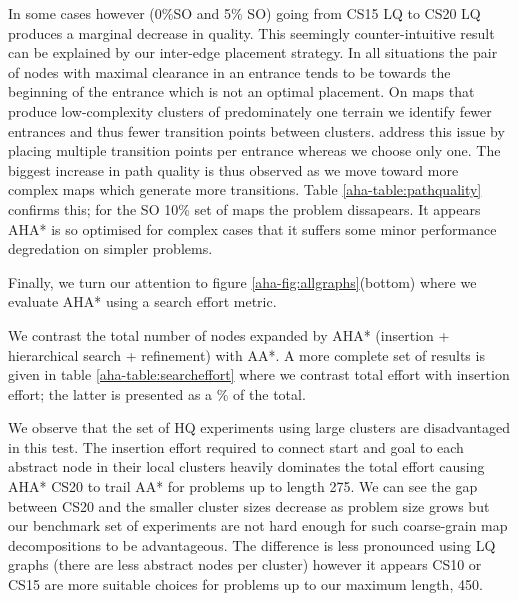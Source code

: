 In some cases however (0\%SO and 5\% SO) going from CS15 LQ to CS20 LQ produces a marginal decrease in quality. 
This seemingly counter-intuitive result can be explained by our inter-edge placement strategy. 
In all situations the pair of nodes with maximal clearance in an entrance tends to be towards the beginning of the entrance which is not an optimal placement. 
On maps that produce low-complexity clusters of predominately one terrain we identify fewer entrances and thus fewer transition points between clusters. 
\cite{botea04} address this issue by placing multiple transition points per entrance whereas we choose only one. 
The biggest increase in path quality is thus observed as we move toward more complex maps which generate more transitions. 
Table \ref{aha-table:pathquality} confirms this; for the SO 10\% set of maps the problem dissapears. 
It appears AHA* is so optimised for complex cases that it suffers some minor performance degredation on simpler problems. 
\par \indent
Finally, we turn our attention to figure \ref{aha-fig:allgraphs}(bottom) where we evaluate AHA* using a search effort metric. 

We contrast the total number of nodes expanded by AHA* (insertion + hierarchical search + refinement) with AA*.
A more complete set of results is given in table \ref{aha-table:searcheffort} where we contrast total effort with insertion effort; the latter is presented as a \% of the total.
\par \indent
We observe that the set of HQ experiments using large clusters are disadvantaged in this test. 
The insertion effort required to connect start and goal to each abstract node in their local clusters heavily dominates the total effort causing AHA* CS20 to trail AA* for problems up to length 275.
We can see the gap between CS20 and the smaller cluster sizes decrease as problem size grows but our benchmark set of experiments are not hard enough for such coarse-grain map decompositions to be advantageous. 
The difference is less pronounced using LQ graphs (there are less abstract nodes per cluster) however it appears CS10 or CS15 are more suitable choices for problems up to our maximum length, 450.
